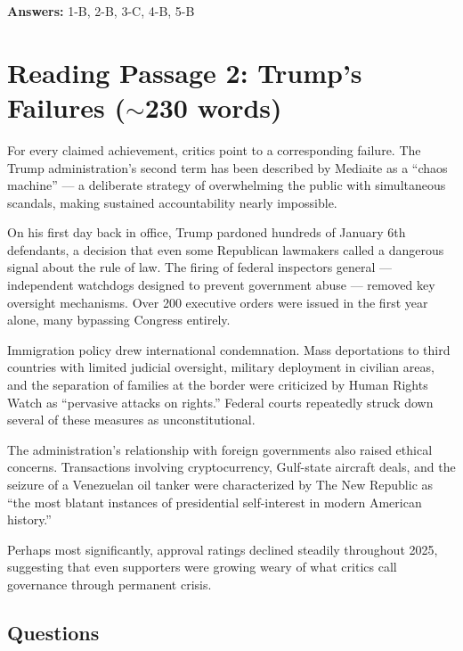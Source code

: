 \documentclass[10pt,a4paper]{article}
\begin{document}
\textbf{Answers:} 1-B, 2-B, 3-C, 4-B, 5-B

\section*{Reading Passage 2: Trump's Failures ($\sim$230 words)}

\begin{tcolorbox}[colback=white, colframe=black]
\small
For every claimed achievement, critics point to a corresponding
failure. The Trump administration's second term has been described
by Mediaite as a ``chaos machine'' --- a deliberate strategy of
overwhelming the public with simultaneous scandals, making sustained
accountability nearly impossible.

On his first day back in office, Trump pardoned hundreds of January
6th defendants, a decision that even some Republican lawmakers
called a dangerous signal about the rule of law. The firing of
federal inspectors general --- independent watchdogs designed to
prevent government abuse --- removed key oversight mechanisms. Over
200 executive orders were issued in the first year alone, many
bypassing Congress entirely.

Immigration policy drew international condemnation. Mass
deportations to third countries with limited judicial oversight,
military deployment in civilian areas, and the separation of
families at the border were criticized by Human Rights Watch as
``pervasive attacks on rights.'' Federal courts repeatedly struck
down several of these measures as unconstitutional.

The administration's relationship with foreign governments also
raised ethical concerns. Transactions involving cryptocurrency,
Gulf-state aircraft deals, and the seizure of a Venezuelan oil
tanker were characterized by The New Republic as ``the most blatant
instances of presidential self-interest in modern American history.''

Perhaps most significantly, approval ratings declined steadily
throughout 2025, suggesting that even supporters were growing weary
of what critics call governance through permanent crisis.
\end{tcolorbox}

\subsection*{Questions}
\end{document}
